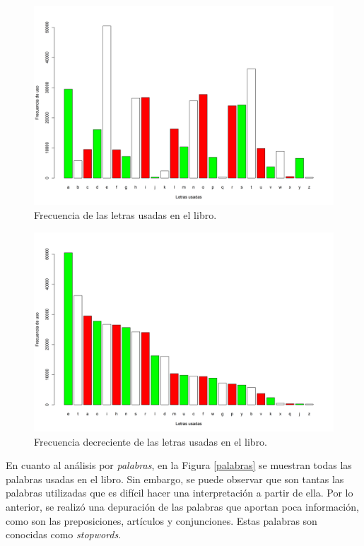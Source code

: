 \documentclass[fontsize=12pt]{article}
\begin{document}
\begin{figure}
\centering
\includegraphics[scale=0.55]{Figures/letrasFiltradas.png}
\caption{Frecuencia de las letras usadas en el libro.}
\label{letrasfiltradas}
\end{figure}

\begin{figure}
\centering
\includegraphics[scale=0.55]{Figures/letrasFiltradasDrec.png}
\caption{Frecuencia decreciente de las letras usadas en el libro.}
\label{letrasfiltradasdecr}
\end{figure}

En cuanto al análisis por \emph{palabras}, en la Figura \ref{palabras} se muestran todas las palabras usadas en el libro. Sin embargo, se puede observar que son tantas las palabras utilizadas que es difícil hacer una interpretación a partir de ella. Por lo anterior, se realizó una depuración de las palabras que aportan poca información, como son las preposiciones, artículos y conjunciones. Estas palabras son conocidas como \textit{stopwords}. 
\end{document}
